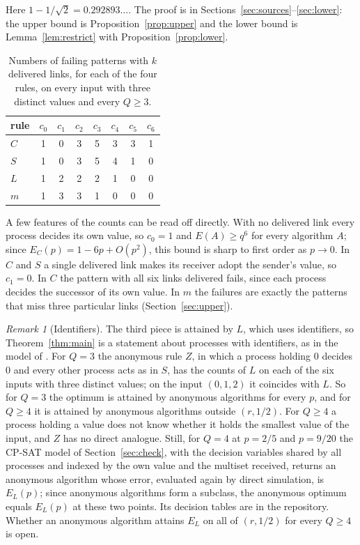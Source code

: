 \documentclass[11pt]{article}
\theoremstyle{remark}
\newtheorem{remark}[theorem]{Remark}
\begin{document}
Here $1-1/\sqrt2=0.292893\dots$. The proof is in Sections~\ref{sec:sources}--\ref{sec:lower}: the upper bound is Proposition~\ref{prop:upper} and the lower bound is Lemma~\ref{lem:restrict} with Proposition~\ref{prop:lower}.

\begin{table}[tbp]
\centering
\begin{tabular}{lccccccc}
\toprule
rule & $c_0$ & $c_1$ & $c_2$ & $c_3$ & $c_4$ & $c_5$ & $c_6$\\
\midrule
$C$ & 1 & 0 & 3 & 5 & 3 & 3 & 1\\
$S$ & 1 & 0 & 3 & 5 & 4 & 1 & 0\\
$L$ & 1 & 2 & 2 & 2 & 1 & 0 & 0\\
$m$ & 1 & 3 & 3 & 1 & 0 & 0 & 0\\
\bottomrule
\end{tabular}
\caption{Numbers of failing patterns with $k$ delivered links, for each of the four rules, on every input with three distinct values and every $Q\ge3$.}\label{tab:counts}
\end{table}

A few features of the counts can be read off directly. With no delivered link every process decides its own value, so $c_0=1$ and $E(A)\ge q^6$ for every algorithm $A$; since $E_C(p)=1-6p+O(p^2)$, this bound is sharp to first order as $p\to0$. In $C$ and $S$ a single delivered link makes its receiver adopt the sender's value, so $c_1=0$. In $C$ the pattern with all six links delivered fails, since each process decides the successor of its own value. In $m$ the failures are exactly the patterns that miss three particular links (Section~\ref{sec:upper}).

\begin{remark}[Identifiers]\label{rem:anon}
The third piece is attained by $L$, which uses identifiers, so Theorem~\ref{thm:main} is a statement about processes with identifiers, as in the model of \cite{FPR}. For $Q=3$ the anonymous rule $Z$, in which a process holding $0$ decides $0$ and every other process acts as in $S$, has the counts of $L$ on each of the six inputs with three distinct values; on the input $(0,1,2)$ it coincides with $L$. So for $Q=3$ the optimum is attained by anonymous algorithms for every $p$, and for $Q\ge4$ it is attained by anonymous algorithms outside $(r,1/2)$. For $Q\ge4$ a process holding a value does not know whether it holds the smallest value of the input, and $Z$ has no direct analogue. Still, for $Q=4$ at $p=2/5$ and $p=9/20$ the CP-SAT model of Section~\ref{sec:check}, with the decision variables shared by all processes and indexed by the own value and the multiset received, returns an anonymous algorithm whose error, evaluated again by direct simulation, is $E_L(p)$; since anonymous algorithms form a subclass, the anonymous optimum equals $E_L(p)$ at these two points. Its decision tables are in the repository. Whether an anonymous algorithm attains $E_L$ on all of $(r,1/2)$ for every $Q\ge4$ is open.
\end{remark}
\end{document}
